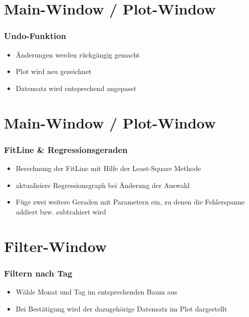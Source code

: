 \documentclass{beamer}
\begin{document}
    \section{Main-Window / Plot-Window}
    \begin{frame}
			\frametitle{Undo-Funktion}
			\begin{itemize}
				\setlength\itemsep{1em}
				\item Änderungen werden rückgängig gemacht
				\item Plot wird neu gezeichnet
				\item Datensatz wird entsprechend angepasst
			\end{itemize}
    \end{frame}


    \section{Main-Window / Plot-Window}
    \begin{frame}
			\frametitle{FitLine \& Regressionsgeraden}
			\begin{itemize}
				\setlength\itemsep{1em}
				\item Berechnung der FitLine mit Hilfe der Least-Square Methode
				\item aktualisiere Regressionsgraph bei Änderung der Auswahl
				\item Füge zwei weitere Geraden mit Parametern ein, zu denen die Fehlerspanne addiert bzw. subtrahiert wird
			\end{itemize}
    \end{frame}



    \section{Filter-Window}
    \begin{frame}
			\frametitle{Filtern nach Tag}
			\begin{itemize}
				\setlength\itemsep{1em}
				\item Wähle Monat und Tag im entsprechenden Baum aus
				\item Bei Bestätigung wird der dazugehörige Datensatz im Plot dargestellt
			\end{itemize}
    \end{frame}
    
\end{document}
